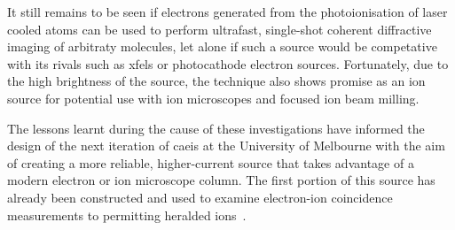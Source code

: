 It still remains to be seen if electrons generated from the photoionisation of laser cooled atoms can be used to perform ultrafast, single-shot coherent diffractive imaging of arbitraty molecules, let alone if such a source would be competative with its rivals such as \glspl{xfel} or photocathode electron sources.
Fortunately, due to the high brightness of the source, the technique also shows promise as an ion source for potential use with ion microscopes and focused ion beam milling.

The lessons learnt during the cause of these investigations have informed the design of the next iteration of \gls{caeis} at the University of Melbourne with the aim of creating a more reliable, higher-current source that takes advantage of a modern electron or ion microscope column.
The first portion of this source has already been constructed and used to examine electron-ion coincidence measurements to permitting heralded ions~\cite{mcculloch_heralded_2018}.